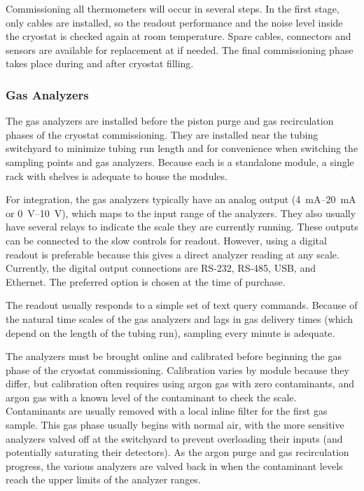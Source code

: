 Commissioning all thermometers will occur in several steps. In the first stage, only cables %
are installed, so
the readout performance and the noise level inside the cryostat %
is checked again at room temperature.
Spare cables, connectors and sensors are available for replacement at  if needed. 
The final commissioning phase %
takes place during and after cryostat filling.  


\subsubsection{Gas Analyzers}
\label{sec:fdgen-slow-cryo-install-ga}


The gas analyzers %
are installed before the piston purge and gas recirculation phases of the cryostat commissioning. They %
are installed near the tubing switchyard to minimize tubing run length and for convenience when switching the sampling points and gas analyzers. Because each is a standalone module, a single rack with shelves %
is adequate to house the modules.

For integration, the gas analyzers typically have an analog output (\SIrange{4}{20}{mA} or \SIrange{0}{10}{V}), which maps to the input range of the analyzers. They also usually have several relays to indicate the scale they are currently running. These outputs can be connected to the slow controls for readout. However, using a digital readout is preferable because this gives a direct analyzer reading at any scale. Currently, the digital output connections are RS-232, RS-485, USB, and Ethernet. The preferred option is chosen at the time of purchase. %

The readout usually responds to a simple set of text query commands. Because of the natural time scales of the gas analyzers and lags in gas delivery times (which depend on the length of the tubing run), sampling every minute is adequate.

The analyzers %
must be brought online and calibrated before beginning the gas phase of the cryostat commissioning.  Calibration varies by module because they differ, but calibration often requires using argon gas with zero contaminants, and argon gas with a known level of the contaminant to check the scale. Contaminants are usually removed with a local inline filter for the first gas sample. %
This gas phase usually begins with normal air, with the more sensitive analyzers valved off at the switchyard to prevent overloading their inputs (and potentially saturating their detectors). As the argon purge and gas recirculation progress, the various analyzers %
are valved back in when the contaminant levels reach the upper limits of the analyzer ranges. 

